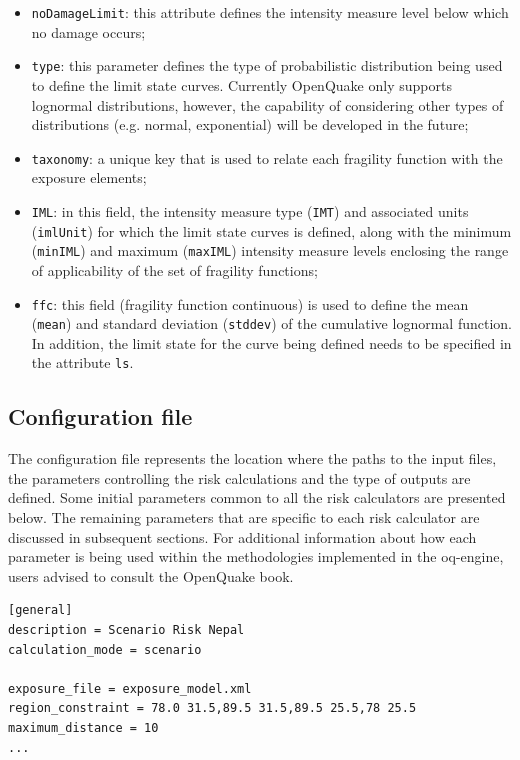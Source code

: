 \begin{itemize}
\item  \Verb+noDamageLimit+: this attribute defines the intensity measure level below which no damage occurs;
\item  \Verb+type+: this parameter defines the type of probabilistic distribution being used to define the limit state curves. Currently OpenQuake only supports lognormal distributions, however, the capability of considering other types of distributions (e.g. normal, exponential) will be developed in the future;
\item  \Verb+taxonomy+: a unique key that is used to relate each fragility function with the exposure elements; 
\item  \Verb+IML+: in this field, the intensity measure type (\Verb+IMT+) and associated units (\Verb+imlUnit+) for which the limit state curves is defined, along with the minimum (\Verb+minIML+) and maximum (\Verb+maxIML+) intensity measure levels enclosing the range of applicability of the set of fragility functions;
\item  \Verb+ffc+: this field (fragility function continuous) is used to define the mean (\Verb+mean+) and standard deviation (\Verb+stddev+) of the cumulative lognormal function. In addition, the limit state for the curve being defined needs to be specified in the attribute \Verb+ls+.
\end{itemize}

\subsection{Configuration file}
The configuration file represents the location where the paths to the input files, the parameters controlling the risk calculations and the type of outputs are defined. Some initial parameters common to all the risk calculators are presented below. The remaining parameters that are specific to each risk calculator are discussed in subsequent sections. For additional information about how each parameter is being used within the methodologies implemented in the oq-engine, users advised to consult the OpenQuake book. 

\begin{Verbatim}[frame=single, commandchars=\\\{\}, samepage=true]
[general]
description = Scenario Risk Nepal
calculation_mode = scenario

exposure_file = exposure_model.xml
region_constraint = 78.0 31.5,89.5 31.5,89.5 25.5,78 25.5
maximum_distance = 10
...
\end{Verbatim}

